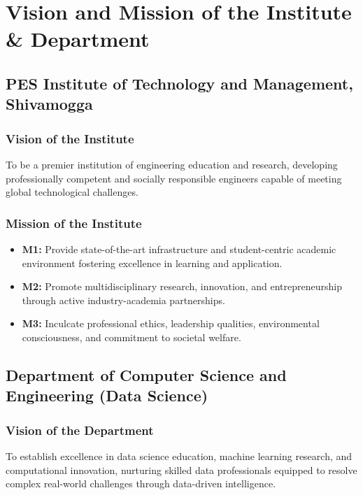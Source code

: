 \chapter*{Vision and Mission of the Institute \& Department}

\section*{PES Institute of Technology and Management, Shivamogga}

\subsection*{Vision of the Institute}
To be a premier institution of engineering education and research, developing professionally competent and socially responsible engineers capable of meeting global technological challenges.

\subsection*{Mission of the Institute}
\begin{itemize}
    \item \textbf{M1:} Provide state-of-the-art infrastructure and student-centric academic environment fostering excellence in learning and application.
    \item \textbf{M2:} Promote multidisciplinary research, innovation, and entrepreneurship through active industry-academia partnerships.
    \item \textbf{M3:} Inculcate professional ethics, leadership qualities, environmental consciousness, and commitment to societal welfare.
\end{itemize}

\vspace{0.8cm}
\section*{Department of Computer Science and Engineering (Data Science)}

\subsection*{Vision of the Department}
To establish excellence in data science education, machine learning research, and computational innovation, nurturing skilled data professionals equipped to resolve complex real-world challenges through data-driven intelligence.

